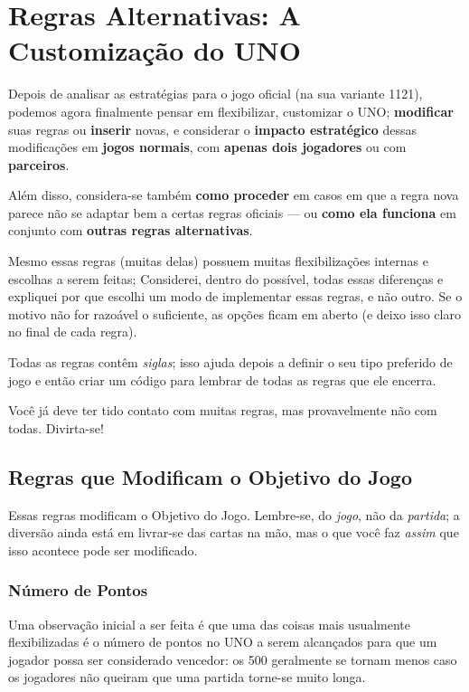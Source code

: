 \chapter{Regras Alternativas: A Customização do UNO}

Depois de analisar as estratégias para o jogo oficial (na sua variante 1121), podemos agora finalmente pensar em flexibilizar, customizar o UNO; \textbf{modificar} suas regras ou \textbf{inserir} novas, e considerar o \textbf{impacto estratégico} dessas modificações em \textbf{jogos normais}, com \textbf{apenas dois jogadores} ou com \textbf{parceiros}.

Além disso, considera-se também \textbf{como proceder} em casos em que a regra nova parece não se adaptar bem a certas regras oficiais --- ou \textbf{como ela funciona} em conjunto com \textbf{outras regras alternativas}.

Mesmo essas regras (muitas delas) possuem muitas flexibilizações internas e escolhas a serem feitas; Considerei, dentro do possível, todas essas diferenças e expliquei por que escolhi um modo de implementar essas regras, e não outro. Se o motivo não for razoável o suficiente, as opções ficam em aberto (e deixo isso claro no final de cada regra).

Todas as regras contêm \textit{siglas}; isso ajuda depois a definir o seu tipo preferido de jogo e então criar um código para lembrar de todas as regras que ele encerra.

Você já deve ter tido contato com muitas regras, mas provavelmente não com todas. Divirta-se!

\section{Regras que Modificam o Objetivo do Jogo}

Essas regras modificam o Objetivo do Jogo. Lembre-se, do \textit{jogo}, não da \textit{partida}; a diversão ainda está em livrar-se das cartas na mão, mas o que você faz \emph{assim} que isso acontece pode ser modificado.

\subsection{Número de Pontos}

Uma observação inicial a ser feita é que uma das coisas mais usualmente flexibilizadas é o número de pontos no UNO a serem alcançados para que um jogador possa ser considerado vencedor: os 500 geralmente se tornam menos caso os jogadores não queiram que uma partida torne-se muito longa.

